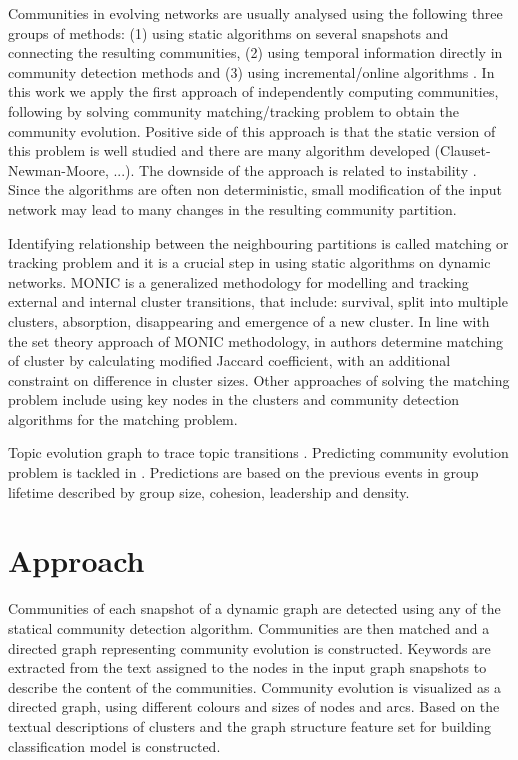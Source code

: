\documentclass{article} %
\begin{document}
Communities in evolving networks are usually analysed using the following three groups of methods: (1) using static algorithms on several snapshots and connecting the resulting communities, (2) using temporal information directly in community detection methods and (3) using incremental/online algorithms \cite{aynaud}. In this work we apply the first approach of independently computing communities, following by solving community matching/tracking problem to obtain the community evolution. Positive side of this approach is that the static version of this problem is well studied and there are many algorithm developed (Clauset-Newman-Moore\cite{clauset-newman-moore}, ...). The downside of the approach is related to instability \cite{aynaud2010}. Since the algorithms are often non deterministic, small modification of the input network may lead to many changes in the resulting community partition.
 
Identifying relationship between the neighbouring partitions is called matching or tracking problem and it is a crucial step in using static algorithms on dynamic networks.
MONIC \cite{spiliopoulou} is a generalized methodology for modelling and tracking external and internal cluster transitions, that include: survival, split into multiple clusters, absorption, disappearing and emergence of a new cluster. In line with the set theory approach of  MONIC methodology, in \cite{gliwa2013} authors determine matching of cluster by calculating modified Jaccard coefficient, with an additional constraint on difference in cluster sizes. Other approaches of solving the matching problem include using key nodes in the clusters \cite{wang} and community detection algorithms for the matching problem\cite{palla}.

Topic evolution graph to trace topic transitions \cite{mei2005}.
Predicting community evolution problem is tackled in \cite{gliwa2013}. Predictions are based on the previous events in group lifetime described by group size, cohesion, leadership and density.

\section{Approach}
Communities of each snapshot of a dynamic graph are detected using any of the statical community detection algorithm. Communities are then matched and a directed graph representing community evolution is constructed. Keywords are extracted from the text assigned to the nodes in the input graph snapshots to describe the content of the communities. Community evolution is visualized as a directed graph, using different colours and sizes of nodes and arcs. Based on the textual descriptions of clusters and the graph structure feature set for building classification model is constructed.
\end{document}
